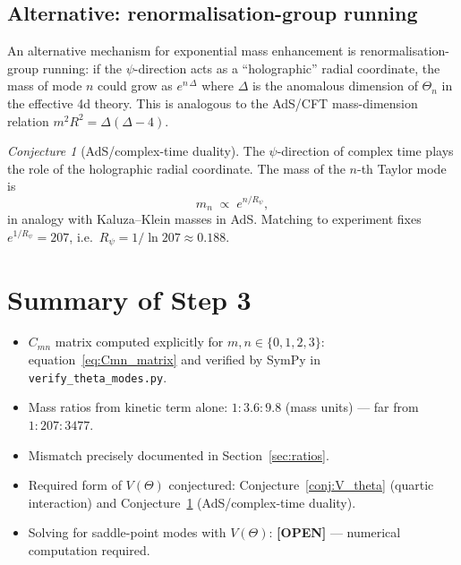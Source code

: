 \documentclass[12pt,a4paper]{article}
\theoremstyle{remark}
\newtheorem{conjecture}[theorem]{Conjecture}
\begin{document}
\subsection{Alternative: renormalisation-group running}

An alternative mechanism for exponential mass enhancement is
renormalisation-group running: if the $\psi$-direction acts as a
``holographic'' radial coordinate, the mass of mode $n$ could grow
as $e^{n\,\Delta}$ where $\Delta$ is the anomalous dimension of
$\Theta_n$ in the effective 4d theory.  This is analogous to the
AdS/CFT mass-dimension relation $m^2 R^2 = \Delta(\Delta-4)$.

\begin{conjecture}[AdS/complex-time duality]
\label{conj:ads_psi}
The $\psi$-direction of complex time plays the role of the holographic
radial coordinate.  The mass of the $n$-th Taylor mode is
\begin{equation}
  m_n \;\propto\; e^{n/R_\psi},
\end{equation}
in analogy with Kaluza--Klein masses in AdS.  Matching to experiment
fixes $e^{1/R_\psi} = 207$, i.e.\ $R_\psi = 1/\ln 207 \approx 0.188$.
\end{conjecture}

\section{Summary of Step 3}
\label{sec:summary}

\begin{itemize}
  \item[\checkmark] $C_{mn}$ matrix computed explicitly for
        $m,n\in\{0,1,2,3\}$: equation~\eqref{eq:Cmn_matrix}
        and verified by SymPy in \texttt{verify\_theta\_modes.py}.
  \item[\checkmark] Mass ratios from kinetic term alone:
        $1:3.6:9.8$ (mass units) --- far from $1:207:3477$.
  \item[\checkmark] Mismatch precisely documented in
        Section~\ref{sec:ratios}.
  \item[\checkmark] Required form of $V(\Theta)$ conjectured:
        Conjecture~\ref{conj:V_theta} (quartic interaction) and
        Conjecture~\ref{conj:ads_psi} (AdS/complex-time duality).
  \item[$\square$] Solving for saddle-point modes with $V(\Theta)$:
        \textbf{[OPEN]} --- numerical computation required.
\end{itemize}
\end{document}
